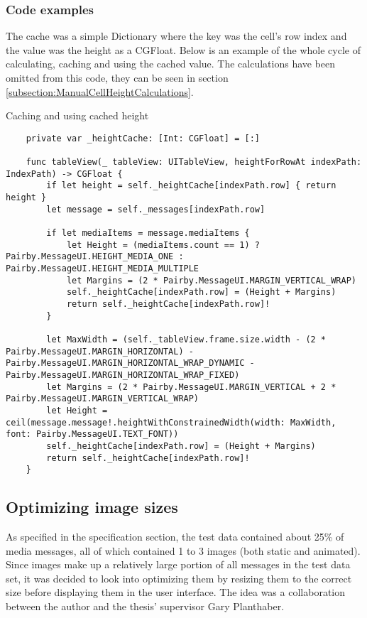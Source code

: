 \documentclass[a4paper,12pt]{article}
\begin{document}
\subsubsection{Code examples}
The cache was a simple Dictionary where the key was the cell's row index and the value was the height as a CGFloat. Below is an example of the whole cycle of calculating, caching and using the cached value. The calculations have been omitted from this code, they can be seen in section \ref{subsection:ManualCellHeightCalculations}. 
\begin{listing}[H]
  \caption{Caching and using cached height}
  \begin{verbatim}
    private var _heightCache: [Int: CGFloat] = [:]

    func tableView(_ tableView: UITableView, heightForRowAt indexPath: IndexPath) -> CGFloat {
        if let height = self._heightCache[indexPath.row] { return height }
        let message = self._messages[indexPath.row]

        if let mediaItems = message.mediaItems {
            let Height = (mediaItems.count == 1) ? Pairby.MessageUI.HEIGHT_MEDIA_ONE : Pairby.MessageUI.HEIGHT_MEDIA_MULTIPLE
            let Margins = (2 * Pairby.MessageUI.MARGIN_VERTICAL_WRAP)
            self._heightCache[indexPath.row] = (Height + Margins)
            return self._heightCache[indexPath.row]!
        }

        let MaxWidth = (self._tableView.frame.size.width - (2 * Pairby.MessageUI.MARGIN_HORIZONTAL) - Pairby.MessageUI.MARGIN_HORIZONTAL_WRAP_DYNAMIC - Pairby.MessageUI.MARGIN_HORIZONTAL_WRAP_FIXED)
        let Margins = (2 * Pairby.MessageUI.MARGIN_VERTICAL + 2 * Pairby.MessageUI.MARGIN_VERTICAL_WRAP)
        let Height = ceil(message.message!.heightWithConstrainedWidth(width: MaxWidth, font: Pairby.MessageUI.TEXT_FONT))
        self._heightCache[indexPath.row] = (Height + Margins)
        return self._heightCache[indexPath.row]!
    }
  \end{verbatim}
\end{listing}


\subsection{Optimizing image sizes}
\label{sec:optimizing-image-sizes}
As specified in the specification section, the test data contained about 25\% of media messages, all of which contained 1 to 3 images (both static and animated). Since images make up a relatively large portion of all messages in the test data set, it was decided to look into optimizing them by resizing them to the correct size before displaying them in the user interface. The idea was a collaboration between the author and the thesis' supervisor Gary Planthaber.
\end{document}
